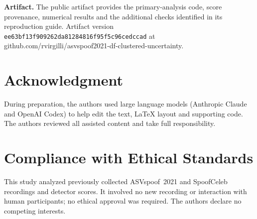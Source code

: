 \documentclass{article}
\renewcommand{\small}{\fontsize{9.1pt}{10.5pt}\selectfont}
\begin{document}
\begingroup\raggedright
\textbf{Artifact.} The public artifact provides the primary-analysis code, score provenance, numerical results and the additional checks identified in its reproduction guide. Artifact version \texttt{ee63bf13f909262da81284816f95f5c96cedccad} at \mbox{github.com/rvirgilli/asvspoof2021-df-clustered-uncertainty}.\par\endgroup

\section{Acknowledgment}
During preparation, the authors used large language models (Anthropic Claude and OpenAI Codex) to help edit the text, LaTeX layout and supporting code. The authors reviewed all assisted content and take full responsibility.

\section{Compliance with Ethical Standards}
This study analyzed previously collected ASVspoof~2021 and SpoofCeleb recordings and detector scores. It involved no new recording or interaction with human participants; no ethical approval was required. The authors declare no competing interests.

\clearpage
\let\oldthebibliography\thebibliography
\renewcommand{\thebibliography}[1]{\oldthebibliography{#1}%
  \setlength{\itemsep}{0pt}\setlength{\parsep}{0pt}\setlength{\parskip}{0pt}\setlength{\topsep}{2pt}}
{\small


}
\end{document}
